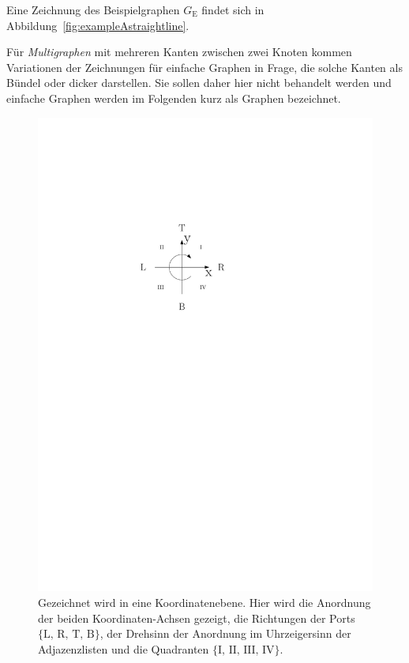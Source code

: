 \documentclass[a4paper]{scrreprt}
\theoremstyle{definition}
\begin{document}
Eine Zeichnung des Beispielgraphen $G_\text{E}$ findet sich in Abbildung~\ref{fig:exampleAstraightline}.

Für \emph{Multigraphen} mit mehreren Kanten zwischen zwei Knoten kommen Variationen der Zeichnungen für einfache Graphen in Frage, die solche Kanten als Bündel oder dicker darstellen. Sie sollen daher hier nicht behandelt werden und einfache Graphen werden im Folgenden kurz als Graphen bezeichnet.

\begin{figure}[h]
  \centering
  \includegraphics[scale=.6]{koordinatengitter}
  \caption{Gezeichnet wird in eine Koordinatenebene. Hier wird die Anordnung der beiden Koordinaten-Achsen gezeigt, die Richtungen der Ports $\{\text{L, R, T, B}\}$, der Drehsinn der Anordnung im Uhrzeigersinn der Adjazenzlisten und die Quadranten $\{\text{I, II, III, IV}\}$.}
  \label{fig:coords}
\end{figure}
\end{document}
